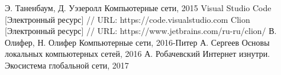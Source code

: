 \makeatletter \renewcommand{} \makeatother
\renewcommand\refname{Список использованных источников}
\begin{thebibliography}{00}
	
	Э. Таненбаум, Д. Уэзеролл Компьютерные сети, 2015
	Visual Studio Code [Электронный ресурс] // URL: https://code.visualstudio.com
	Clion [Электронный ресурс] // URL: https://www.jetbrains.com/ru-ru/clion/
	В. Олифер, Н. Олифер Компьютерные сети, 2016-Питер
	А. Сергеев Основы локальных компьютерных сетей, 2016
	А. Робачевский Интернет изнутри. Экосистема глобальной сети, 2017

\end{thebibliography}
